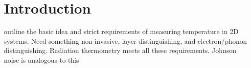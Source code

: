 \chapter{Introduction}
\label{ch:introduction}

outline the basic idea and strict requirements of measuring temperature in 2D systems. Need something non-invasive, layer distinguishing, and electron/phonon distinguishing. Radiation thermometry meets all these requirements. Johnson noise is analogous to this
